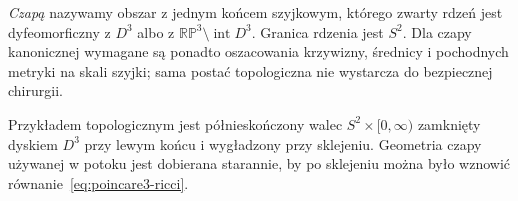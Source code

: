 \begin{definicja}
\label{def:poincare3-cap}
\emph{Czapą} nazywamy obszar z jednym końcem
szyjkowym, którego zwarty rdzeń jest dyfeomorficzny
z $D^3$ albo z $\mathbb{RP}^3\setminus
\operatorname{int}D^3$. Granica rdzenia jest
$S^2$. Dla czapy kanonicznej wymagane są ponadto
oszacowania krzywizny, średnicy i pochodnych
metryki na skali szyjki; sama postać topologiczna
nie wystarcza do bezpiecznej chirurgii.
\end{definicja}

Przykładem topologicznym jest półnieskończony
walec $S^2\times[0,\infty)$ zamknięty dyskiem
$D^3$ przy lewym końcu i wygładzony przy
sklejeniu. Geometria czapy używanej w potoku
jest dobierana starannie, by po sklejeniu
można było wznowić równanie~\eqref{eq:poincare3-ricci}.

